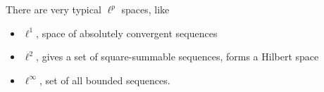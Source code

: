 \begin{remark}\rm\nextline
	There are very typical $\ell^p$ spaces, like
	\begin{itemize}
		\item $\ell^1$, space of absolutely convergent sequences
		\item $\ell^2$, gives a set of square-summable sequences, forms a Hilbert space
		\item $\ell^\infty$, set of all bounded sequences.
	\end{itemize}

\end{remark}